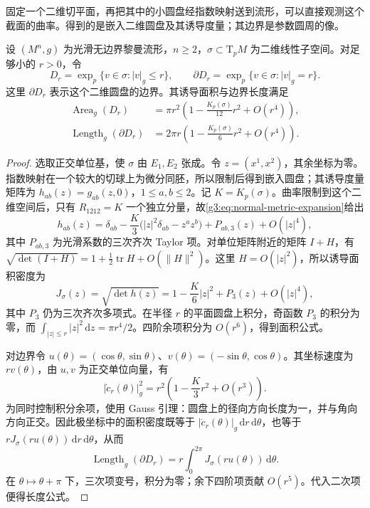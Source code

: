 固定一个二维切平面，再把其中的小圆盘经指数映射送到流形，可以直接观测这个截面的曲率。得到的是嵌入二维圆盘及其诱导度量；其边界是参数圆周的像。

\begin{proposition}\label{g3:prop:normal-plane-disk-geometry}
	设 \((M^n,g)\) 为光滑无边界黎曼流形，\(n\ge2\)，\(\sigma\subset\mathrm T_pM\) 为二维线性子空间。对足够小的 \(r>0\)，令
	\[
		D_r=\exp_p\{v\in\sigma:|v|_g\le r\},\qquad
		\partial D_r=\exp_p\{v\in\sigma:|v|_g=r\}.
	\]
	这里 \(\partial D_r\) 表示这个二维圆盘的边界。其诱导面积与边界长度满足
	\begin{equation}\label{g3:eq:normal-plane-disk-geometry}
		\begin{aligned}
			\operatorname{Area}_g(D_r)
			&=\pi r^2\left(1-\frac{K_p(\sigma)}{12}r^2+O(r^4)\right),\\
			\operatorname{Length}_g(\partial D_r)
			&=2\pi r\left(1-\frac{K_p(\sigma)}6r^2+O(r^4)\right).
		\end{aligned}
	\end{equation}
\end{proposition}
\begin{proof}
	选取正交单位基，使 \(\sigma\) 由 \(E_1,E_2\) 张成。令 \(z=(x^1,x^2)\)，其余坐标为零。指数映射在一个较大的切球上为微分同胚，所以限制后得到嵌入圆盘；其诱导度量矩阵为 \(h_{ab}(z)=g_{ab}(z,0)\)，\(1\le a,b\le2\)。记 \(K=K_p(\sigma)\)。曲率限制到这个二维空间后，只有 \(R_{1212}=K\) 一个独立分量，故\eqref{g3:eq:normal-metric-expansion}给出
	\[
		h_{ab}(z)=\delta_{ab}
		-\frac K3\bigl(|z|^2\delta_{ab}-z^az^b\bigr)
		+P_{ab,3}(z)+O(|z|^4),
	\]
	其中 \(P_{ab,3}\) 为光滑系数的三次齐次 Taylor 项。对单位矩阵附近的矩阵 \(I+H\)，有 \(\sqrt{\det(I+H)}=1+\tfrac12\operatorname{tr}H+O(\|H\|^2)\)。这里 \(H=O(|z|^2)\)，所以诱导面积密度为
	\[
		J_\sigma(z)=\sqrt{\det h(z)}
		=1-\frac K6|z|^2+P_3(z)+O(|z|^4),
	\]
	其中 \(P_3\) 仍为三次齐次多项式。在半径 \(r\) 的平面圆盘上积分，奇函数 \(P_3\) 的积分为零，而 \(\int_{|z|\le r}|z|^2\,\mathrm dz=\pi r^4/2\)。四阶余项积分为 \(O(r^6)\)，得到面积公式。

	对边界令 \(u(\theta)=(\cos\theta,\sin\theta)\)、\(v(\theta)=(-\sin\theta,\cos\theta)\)。其坐标速度为 \(rv(\theta)\)，由 \(u,v\) 为正交单位向量，有
	\[
		|\dot c_r(\theta)|_g^2
		=r^2\left(1-\frac K3r^2+O(r^3)\right).
	\]
	为同时控制积分余项，使用 Gauss 引理：圆盘上的径向方向长度为一，并与角向方向正交。因此极坐标中的面积密度既等于 \(|\dot c_r(\theta)|_g\,\mathrm dr\,\mathrm d\theta\)，也等于 \(rJ_\sigma(ru(\theta))\,\mathrm dr\,\mathrm d\theta\)，从而
	\[
		\operatorname{Length}_g(\partial D_r)
		=r\int_0^{2\pi}J_\sigma(ru(\theta))\,\mathrm d\theta.
	\]
	在 \(\theta\mapsto\theta+\pi\) 下，三次项变号，积分为零；余下四阶项贡献 \(O(r^5)\)。代入二次项便得长度公式。
\end{proof}

